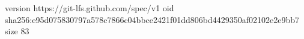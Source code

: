 version https://git-lfs.github.com/spec/v1
oid sha256:e95d075830797a578c7866c04bbce2421f01dd806bd4429350af02102e2e9bb7
size 83
